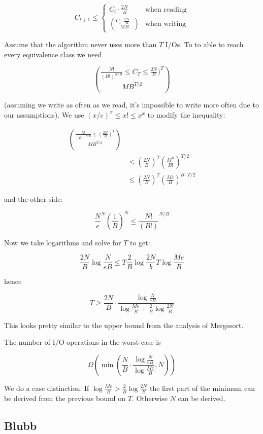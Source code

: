 \[C_{t+1} \leq \begin{cases}
C_t \cdot \frac{2N}{B}	& \text{when reading}\\
C_t \cdot \frac{2N}{B} \cdot \choose{M}{B}	& \text{when writing}
\end{cases}\]

Assume that the algorithm never uses more than $T$ I/Os. To to able to reach every equivalence class we need

\[\frac{N!}{(B!)^{N/B}} \leq C_T \leq \frac{2N}{B})^T \choose{M}{B}^{T/2}\]

(assuming we write as often as we read, it's impossible to write more often due to our assumptions). We use $(x/e)^x\leq x! \leq x^x$ to modify the inequality:

\begin{align*}
\frac{N!}{(B!)^{N/B}} \leq (\frac{2N}{B})^T \choose{M}{B}^{T/2}\\
	&\leq (\frac{2N}{B})^T (\frac{M^B}{B!})^{T/2}\\
	&\leq (\frac{2N}{B})^T (\frac{Me}{B})^{B \cdot T/2}
\end{align*}

and the other side:

\[\frac{N}{e}^N (\frac{1}{B})^N \leq \frac{N!}{(B!)}^{N/B}\]

Now we take logarithms and solve for $T$ to get:

\[\frac{2N}{B} \log \frac{N}{eB} \leq T\frac{2}{B} \log \frac{2N}{b}  T \log \frac{Me}{B}\]

hence

\[T\geq \frac{2N}{B} \cdot \frac{\log \frac{N}{eB}}{\log \frac{Me}{B} + \frac{2}{B} \log \frac{2N}{B}}\]

This looks pretty similar to the upper bound from the analysis of Mergesort.

\begin{thm} The number of I/O-operations in the worst case is 

\[\Omega(\min \left(\frac{N}{B} \cdot \frac{\log \frac{N}{eB}}{\log \frac{Me}{B}}, N\right))\]
\end{thm}

\begin{pr} We do a case distinction. If $\log \frac{Me}{B} > \frac 2B \log \frac{2N}{B}$ the first part of the minimum can be derived from the previous bound on $T$. Otherwise $N$ can be derived.
\end{pr}

\subsection{Blubb}

